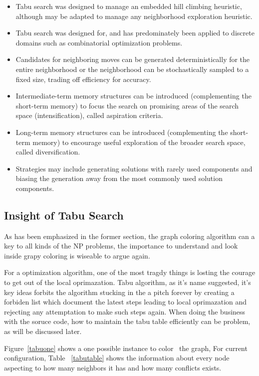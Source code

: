 \documentclass[10pt, a4paper, twocolumn]{article} %
\begin{document}
\begin{itemize}
    \item Tabu search was designed to manage an embedded hill climbing heuristic, although may be adapted to manage any neighborhood exploration heuristic.
    \item Tabu search was designed for, and has predominately been applied to discrete domains such as combinatorial optimization problems.
    \item Candidates for neighboring moves can be generated deterministically for the entire neighborhood or the neighborhood can be stochastically sampled to a fixed size, trading off efficiency for accuracy.
    \item Intermediate-term memory structures can be introduced (complementing the short-term memory) to focus the search on promising areas of the search space (intensification), called aspiration criteria.
    \item Long-term memory structures can be introduced (complementing the short-term memory) to encourage useful exploration of the broader search space, called diversification.
    \item Strategies may include generating solutions with rarely used components and biasing the generation away from the most commonly used solution components.
\end{itemize}

\subsection{Insight of Tabu Search}
As has been emphasized in the former section, the graph coloring algorithm can
a key to all kinds of the NP problems, the importance to understand and look
inside grapy coloring is wiseable to argue again.

For a optimization algorithm, one of the most tragdy things is losting the
courage to get out of the local oprimazation. Tabu algorithm, as it's name
suggested, it's key ideas forbits the algorithm stucking in the a pitch forever
by creating a forbiden list which document the latest steps leading to local
oprimazation and rejecting any attemptation to make such steps again. When doing
the business with the soruce code, how to maintain the tabu table efficiently
can be problem, as will be discussed later.

Figure~\ref{tabuone} shows a one possible instance to
color~\citep{Reference14} the graph, For current configuration, Table
~\ref{tabutable} shows the information about every node aspecting to how many
neighbors it has and how many conflicts exists.
\end{document}
